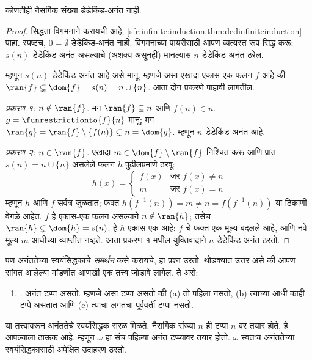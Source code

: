 \begin{prop}\label{sth:z:infinity-again:naturalnumbersarentinfinite}
कोणतीही नैसर्गिक संख्या डेडेकिंड-अनंत नाही.
\end{prop}

\begin{proof}
सिद्धता विगमनाने करायची आहे; \ref{sfr:infinite:induction:thm:dedinfiniteinduction} पाहा. स्पष्टच, $0
= \emptyset$ डेडेकिंड-अनंत नाही. विगमनाच्या पायरीसाठी आपण व्यत्यस्त रूप सिद्ध करू: $s(n)$ डेडेकिंड-अनंत असल्याचे (अशक्य असूनही) मानल्यास $n$ डेडेकिंड-अनंत ठरेल.

म्हणून $s(n)$ डेडेकिंड-अनंत आहे असे मानू. म्हणजे असा एखादा एकास-एक फलन $f$ आहे की $\ran{f}\subsetneq \dom{f} = s(n) = n \cup
\{n\}$. आता दोन प्रकरणे पाहावी लागतील.

\emph{प्रकरण १: $n \notin \ran{f}$.} मग $\ran{f} \subseteq n$ आणि $f(n) \in n$. $g = \funrestrictionto{f}{n}$ मानू; मग $\ran{g} =
\ran{f} \setminus \{f(n)\} \subsetneq n = \dom{g}$. म्हणून $n$ डेडेकिंड-अनंत आहे.

\emph{प्रकरण २: $n \in \ran{f}$.} एखादा $m \in \dom{f} \setminus \ran{f}$ निश्चित करू आणि प्रांत $s(n) = n \cup \{n\}$ असलेले फलन $h$ पुढीलप्रमाणे ठरवू:
\[
h(x) =
	\begin{cases}
		f(x) & \text{जर }f(x) \neq n\\
		m & \text{जर }f(x)=n
	\end{cases}
\]
म्हणून $h$ आणि $f$ सर्वत्र जुळतात; फक्त $h(f^{-1}(n)) = m
\neq n = f(f^{-1}(n))$ या ठिकाणी वेगळे आहेत. $f$ हे एकास-एक फलन असल्याने $n \notin
\ran{h}$; तसेच $\ran{h} \subsetneq \dom{h} = s(n)$.
हे $h$ एकास-एक आहे: $f$ चे फक्त एक मूल्य बदलले आहे,
आणि नवे मूल्य $m$ आधीच्या व्याप्तीत नव्हते.
आता प्रकरण १ मधील युक्तिवादाने $n$ डेडेकिंड-अनंत ठरतो.
\end{proof}

पण अनंततेच्या स्वयंसिद्धकाचे \emph{समर्थन} कसे करायचे, हा प्रश्न उरतो. थोडक्यात उत्तर असे की आपण सांगत आलेल्या मांडणीत आणखी एक तत्त्व जोडावे लागेल. ते असे:
\begin{enumerate}
\item[] \stagesinf. अनंत टप्पा असतो. म्हणजे असा टप्पा असतो की (a) तो पहिला नसतो, (b) त्याच्या आधी काही टप्पे असतात आणि (c) त्याचा लगतचा पूर्ववर्ती टप्पा नसतो.
\end{enumerate}
या तत्त्वावरून अनंततेचे स्वयंसिद्धक सरळ मिळते. नैसर्गिक संख्या $n$ ही टप्पा $n$ वर तयार होते, हे आपल्याला ठाऊक आहे. म्हणून $\omega$ हा संच पहिल्या अनंत टप्प्यावर तयार होतो. $\omega$ स्वतःच अनंततेच्या स्वयंसिद्धकासाठी अपेक्षित उदाहरण ठरतो.

